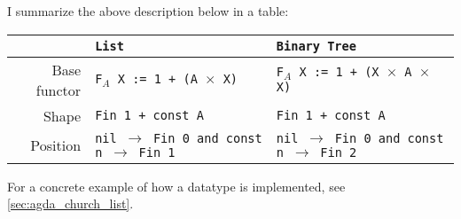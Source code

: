I summarize the above description below in a table:
\begin{table}[h]
  \begin{tabular}{|r|l|l|}\hline
     & \tt{List} &  \tt{Binary Tree} \\\hline
    Base functor         & \tt{F$_A$ X := 1 + (A $\times$ X)}  & \tt{F$_A$ X := 1 + (X $\times$ A $\times$ X)} \\\hline
    Shape  & \tt{Fin 1 + const A} & \tt{Fin 1 + const A} \\\hline
    Position & \tt{nil $\to$ Fin 0 and const n $\to$ Fin 1} & \tt{nil $\to$ Fin 0 and const n $\to$ Fin 2} \\\hline
  \end{tabular}
\end{table}

For a concrete example of how a datatype is implemented, see \autoref{sec:agda_church_list}.
